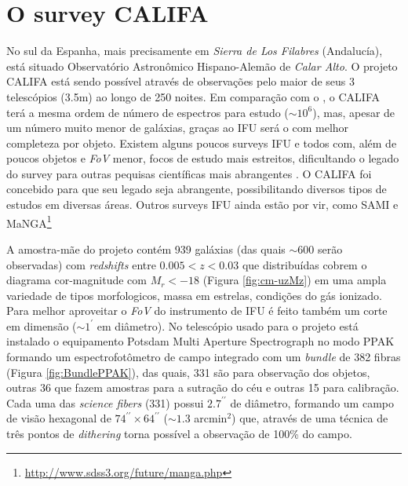 
\section{O survey CALIFA}
\label{sec:CALePyC:Apresent}

No sul da Espanha, mais precisamente em {\em Sierra de Los Filabres} (Andalucía), está situado Observatório Astronômico
Hispano-Alemão de {\em Calar Alto}. O projeto CALIFA está sendo possível através de observações pelo maior de seus 3
telescópios (3.5m) ao longo de 250 noites. Em comparação com o \SDSS, o CALIFA terá a mesma ordem de número de
espectros para estudo ($\sim 10^6$), mas, apesar de um número muito menor de galáxias, graças ao IFU será o com melhor
completeza por objeto. Existem alguns poucos surveys IFU e todos com, além de poucos objetos e {\em FoV} menor, focos de
estudo mais estreitos, dificultando o legado do survey para outras pequisas científicas mais abrangentes \citep[SAURON;
][região central de 72 galáxias com $z < 0.01$.]{de-Zeeuw2002} \citep[PINGS; ][algumas galáxias muito próximas ($\sim
10$ Mpc) e o estudo atual de 70 (U)LIRGs com $z <0.26$]{RosalesOrtega2010} \citep[VENGA; ][$30$ galáxias
espirais]{Blanc2010}. O CALIFA foi concebido para que seu legado seja abrangente, possibilitando diversos tipos de
estudos em diversas áreas. Outros surveys IFU ainda estão por vir, como SAMI \citep{Croom2012} e
MaNGA\footnote{\url{http://www.sdss3.org/future/manga.php}}

A amostra-mãe do projeto contém 939 galáxias (das quais $\sim 600$ serão observadas) com {\em redshifts} entre $0.005 <
z < 0.03$ que distribuídas cobrem o diagrama cor-magnitude com $M_r < -18$ (Figura \ref{fig:cm-uzMz}) em uma ampla
variedade de tipos morfologicos, massa em estrelas, condições do gás ionizado. Para melhor aproveitar o {\em FoV} do
instrumento de IFU é feito também um corte em dimensão ($\sim1^{\prime}$ em diâmetro). No telescópio usado para o
projeto está instalado o equipamento Potsdam Multi Aperture Spectrograph \citep[PMAS; ][]{Roth2005} no modo PPAK
\citep{Verheijen2004, Kelz2006} formando um espectrofotômetro de campo integrado com um {\em bundle} de 382 fibras
(Figura \ref{fig:BundlePPAK}), das quais, 331 são para observação dos objetos, outras 36 que fazem amostras para a
sutração do céu e outras 15 para calibração. Cada uma das {\em science fibers} (331) possui $2.7^{\prime\prime}$ de
diâmetro, formando um campo de visão hexagonal de $74^{\prime\prime} \times 64^{\prime\prime}$ ($\sim1.3$ arcmin$^2$)
que, através de uma técnica de três pontos de {\em dithering} torna possível a observação de 100\% do campo.

